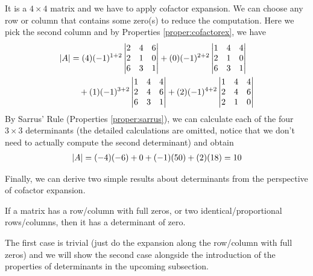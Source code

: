 \begin{solution}
It is a $4 \times 4$ matrix and we have to apply cofactor expansion. We can choose any row or column that contains some zero(s) to reduce the computation. Here we pick the second column and by Properties \ref{proper:cofactorex}, we have
\begin{align*}
\abs{A} &= 
(4)(-1)^{1+2}
\begin{vmatrix}
2 & 4 & 6 \\
2 & 1 & 0 \\
6 & 3 & 1 \\
\end{vmatrix}
+ (0)(-1)^{2+2}
\begin{vmatrix}
1 & 4 & 4 \\
2 & 1 & 0 \\
6 & 3 & 1 \\
\end{vmatrix} \\
& \quad + (1)(-1)^{3+2}
\begin{vmatrix}
1 & 4 & 4 \\
2 & 4 & 6 \\
6 & 3 & 1 \\
\end{vmatrix} 
+ (2)(-1)^{4+2}
\begin{vmatrix}
1 & 4 & 4 \\
2 & 4 & 6 \\
2 & 1 & 0
\end{vmatrix}     
\end{align*}
By Sarrus' Rule (Properties \ref{proper:sarrus}), we can calculate each of the four $3 \times 3$ determinants (the detailed calculations are omitted, notice that we don't need to actually compute the second determinant) and obtain
\begin{align*}
\abs{A} = (-4)(-6) + 0 + (-1)(50) + (2)(18) = 10
\end{align*}
\end{solution}
Finally, we can derive two simple results about determinants from the perspective of cofactor expansion.
\begin{proper}
\label{proper:zerodet}
If a matrix has a row/column with full zeros, or two identical/proportional rows/columns, then it has a determinant of zero.
\end{proper}
The first case is trivial (just do the expansion along the row/column with full zeros) and we will show the second case alongside the introduction of the properties of determinants in the upcoming subsection.

